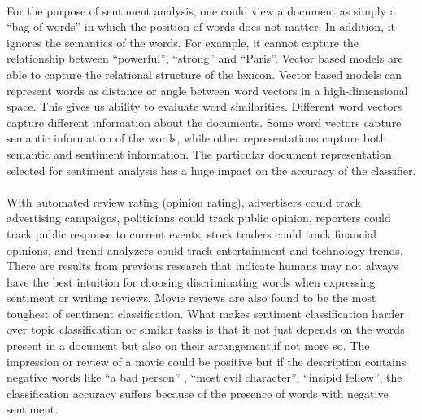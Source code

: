 \documentclass[a4paper,26pt]{article}
\begin{document}
\paragraph{}

For the purpose of sentiment analysis, one could view a document as simply a ``bag of words'' in which the position of words does not matter. In addition, it ignores the semantics of the words. For example, it cannot capture the relationship between ``powerful'', ``strong'' and ``Paris''. Vector based models are able to capture the relational structure of the lexicon. Vector based models can represent words as distance or angle between word vectors in a high-dimensional space. This gives us ability to evaluate word similarities. Different word vectors capture different information about the documents. Some word vectors capture semantic information of the words, while other representations capture both semantic and sentiment information. The particular document representation selected for sentiment analysis has a huge impact on the accuracy of the classifier.

\paragraph{}
With automated review rating (opinion rating), advertisers could track advertising campaigns, politicians could track public opinion, reporters could track public response to current events, stock traders could track financial opinions, and trend analyzers could track entertainment and technology trends.
There are results from previous research that indicate humans may not always have the best intuition for choosing
discriminating words when expressing sentiment or writing reviews. 
Movie reviews are also found to be the most toughest of sentiment classification. 
What makes sentiment classification harder over topic classification or similar tasks is that it not just depends on the words present in a document but also on their arrangement,if not more so. The impression or review of a movie could be positive but if the description contains negative words like ``a bad person'' , ``most evil character'', ``insipid fellow'', the classification accuracy suffers because of the presence of words with negative sentiment. 

\paragraph{}
\end{document}
